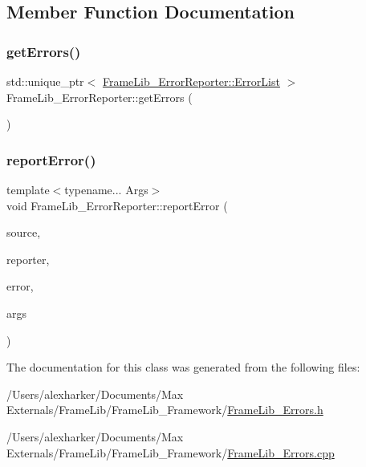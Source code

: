 \subsection{Member Function Documentation}
\mbox{\label{class_frame_lib___error_reporter_a95924f411be44edbe7e69f92e983e89e}} 
\subsubsection{\texorpdfstring{get\+Errors()}{getErrors()}}
{\footnotesize\ttfamily std\+::unique\+\_\+ptr$<$ \hyperlink{class_frame_lib___error_reporter_1_1_error_list}{Frame\+Lib\+\_\+\+Error\+Reporter\+::\+Error\+List} $>$ Frame\+Lib\+\_\+\+Error\+Reporter\+::get\+Errors (\begin{DoxyParamCaption}{ }\end{DoxyParamCaption})}

\mbox{\label{class_frame_lib___error_reporter_a69301a8520fa2d90ce84a637f7bc7827}} 
\subsubsection{\texorpdfstring{report\+Error()}{reportError()}}
{\footnotesize\ttfamily template$<$typename... Args$>$ \\
void Frame\+Lib\+\_\+\+Error\+Reporter\+::report\+Error (\begin{DoxyParamCaption}\item[{\hyperlink{_frame_lib___errors_8h_acdeab3b10c3aca41a844aa51b90b6f39}{Error\+Source}}]{source,  }\item[{\hyperlink{struct_frame_lib___proxy}{Frame\+Lib\+\_\+\+Proxy} $\ast$}]{reporter,  }\item[{const char $\ast$}]{error,  }\item[{Args...}]{args }\end{DoxyParamCaption})\hspace{0.3cm}{\ttfamily [inline]}}



The documentation for this class was generated from the following files\+:\begin{DoxyCompactItemize}
\item 
/\+Users/alexharker/\+Documents/\+Max Externals/\+Frame\+Lib/\+Frame\+Lib\+\_\+\+Framework/\hyperlink{_frame_lib___errors_8h}{Frame\+Lib\+\_\+\+Errors.\+h}\item 
/\+Users/alexharker/\+Documents/\+Max Externals/\+Frame\+Lib/\+Frame\+Lib\+\_\+\+Framework/\hyperlink{_frame_lib___errors_8cpp}{Frame\+Lib\+\_\+\+Errors.\+cpp}\end{DoxyCompactItemize}
